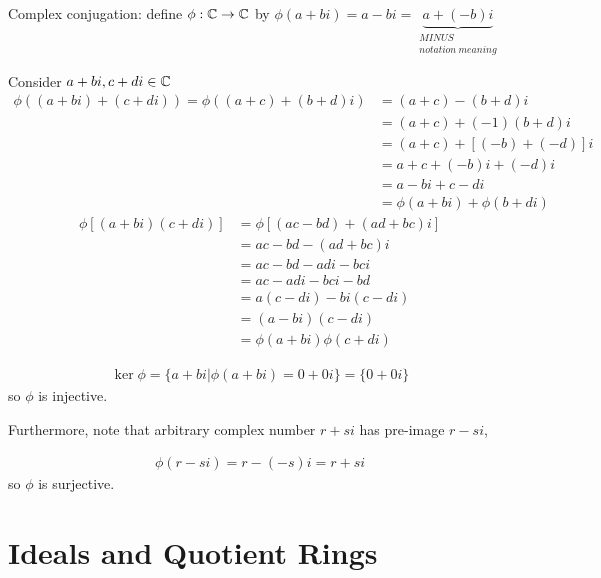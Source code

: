 \begin{example}
Complex conjugation: define $\phi : {\mathbb{C}} \rightarrow {\mathbb{C}} $ by
$\phi(a+bi)=a-bi= \underset{\substack{MINUS \\ notation \ meaning}}{\underbrace{a+(-b)i}}$
\steezybreak

\noindent Consider $a+bi, c+di \in {\mathbb{C}}$
\begin{align}
    \phi((a+bi)+(c+di))= \phi((a+c)+(b+d)i)&= (a+c)-(b+d)i \nonumber \\
    &= (a+c)+(-1)(b+d)i \nonumber \\
    &= (a+c)+[(-b)+(-d)]i \nonumber \\
    &= a+c +(-b)i+(-d)i \nonumber \\
    &= a-bi + c-di \nonumber \\
    &= \phi(a+bi)+\phi(b+di) \nonumber
\end{align}
\begin{align}
    \phi[(a+bi)(c+di)]&=\phi[(ac-bd)+(ad+bc)i] \nonumber \\
    &= ac-bd-(ad+bc)i \nonumber \\
    &= ac-bd-adi-bci \nonumber \\
    &= ac-adi -bci-bd \nonumber \\
    &= a(c-di)-bi(c-di) \nonumber \\
    &= (a-bi)(c-di) \nonumber \\
    &=\phi(a+bi)\phi(c+di) \nonumber
\end{align}

\begin{align}
    \ker\phi = \{a+bi | \phi(a+bi)=0+0i\} = \{0+0i\} \nonumber
\end{align}
so $\phi$ is injective.\steezybreak

\noindent Furthermore, note that arbitrary complex number $r+si$ has pre-image $r-si$,

\begin{align}
    \phi(r-si)=r-(-s)i=r+si \nonumber
\end{align}
so $\phi$ is surjective.
\end{example}
\section{Ideals and Quotient Rings}

